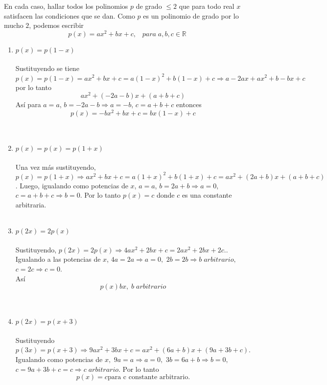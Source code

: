 \begin{ej}
En cada caso, hallar todos los polinomios $p$ de grado $\leq 2$ que para todo real $x$ satisfacen las condiciones que se dan.
Como $p$ es un polinomio de grado por lo mucho $2$, podemos escribir
$$p(x) = ax^2 + bx + c, \; \; \; para \; a,b,c \in \mathbb{R}$$
\begin{enumerate}[\bfseries a)]
\item $p(x) = p(1-x)$\\\\
Sustituyendo se tiene $p(x) = p(1-x) = ax^2 + bx + c = a(1-x)^2 + b(1-x) + c \Rightarrow a - 2ax + ax^2 + b - bx + c$ por lo tanto $$ax^2 + (-2a-b)x + (a+b+c)$$
Así para $a=a$, $b = -2a - b \Rightarrow a=-b$, $c=a+b+c$ entonces $$p(x) = -bx^2 + bx + c = bx(1-x)+c$$\\\\
\item $p(x) = p(x) = p(1+x)$\\\\
Una vez más sustituyendo, $p(x) = p(1+x) \Rightarrow ax^2 + bx + c = a(1+x)^2 + b(1+x) + c = ax^2 + (2a+b)x + (a+b+c)$. Luego, igualando como potencias de $x$, $a=a$, $b=2a+b \Rightarrow a = 0$, $c=a+b+c \Rightarrow b=0$. Por lo tanto $p(x) = c$ donde $c$ es una constante arbitraria.\\\\
\item $p(2x) = 2p(x)$\\\\
Sustituyendo, $p(2x) = 2p(x) \Rightarrow 4ax^2 + 2bx + c = 2ax^2 + 2bx +2c.$. Igualando a las potencias de $x$, $4a=2a \Rightarrow a=0,$ $2b=2b \Rightarrow  b \; arbitrario,$ $c=2c \Rightarrow c=0$.\\
Así $$p(x)bx, \; b \; arbitrario$$\\\\
\item $p(2x) = p(x+3)$\\\\
Sustituyendo $p(3x) = p(x+3) \Rightarrow 9ax^2 + 3bx + c = ax^2 + (6a+b)x + (9a+3b+c)$. Igualando como potencias de $x,$ $9a=a \Rightarrow a=0,$ $3b = 6a+b \Rightarrow b=0,$ $c=9a + 3b + c = c \Rightarrow c \; arbitrario$. Por lo tanto $$p(x)=c \mbox{para c constante arbitrario.}$$\\\\
\end{enumerate}
\end{ej}




